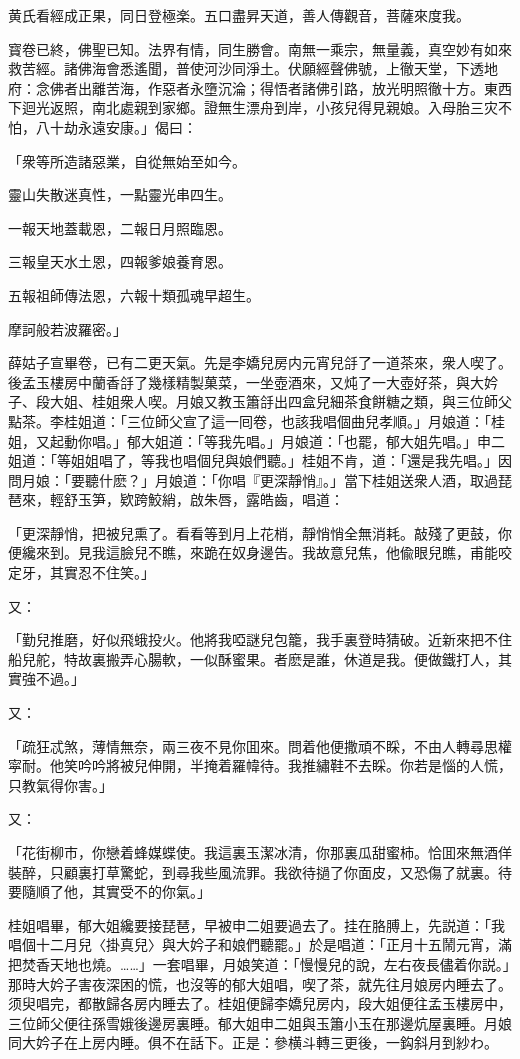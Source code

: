 黄氏看經成正果，同日登極楽。五口盡昇天道，善人傳觀音，菩薩來度我。

寳卷已終，佛聖已知。法界有情，同生勝會。南無一乘宗，無量義，真空妙有如來救苦經。諸佛海會悉遙聞，普使河沙同淨土。伏願經聲佛號，上徹天堂，下透地府：念佛者出離苦海，作惡者永墮沉淪；得悟者諸佛引路，放光明照徹十方。東西下迴光返照，南北處親到家鄉。證無生漂舟到岸，小孩兒得見親娘。入母胎三灾不怕，八十劫永遠安康。」偈曰：

「衆等所造諸惡業，自從無始至如今。

靈山失散迷真性，一點靈光串四生。

一報天地蓋載恩，二報日月照臨恩。

三報皇天水土恩，四報爹娘養育恩。

五報祖師傳法恩，六報十類孤魂早超生。

摩訶般若波羅密。」

薛姑子宣畢卷，已有二更天氣。先是李嬌兒房内元宵兒㧱了一道茶來，衆人喫了。後孟玉樓房中蘭香㧱了幾樣精製菓菜，一坐壺酒來，又炖了一大壺好茶，與大妗子、段大姐、桂姐衆人喫。月娘又教玉簫㧱出四盒兒細茶食餅糖之類，與三位師父點茶。李桂姐道：「三位師父宣了這一囘卷，也該我唱個曲兒孝順。」月娘道：「桂姐，又起動你唱。」郁大姐道：「等我先唱。」月娘道：「也罷，郁大姐先唱。」申二姐道：「等姐姐唱了，等我也唱個兒與娘們聽。」桂姐不肯，道：「還是我先唱。」因問月娘：「要聽什麽？」月娘道：「你唱『更深靜悄』。」當下桂姐送衆人酒，取過琵琶來，輕舒玉笋，欵跨鮫綃，啟朱唇，露皓齒，唱道：

「更深靜悄，把被兒熏了。看看等到月上花梢，靜悄悄全無消耗。敲殘了更鼓，你便纔來到。見我這臉兒不瞧，來跪在奴身邊告。我故意兒焦，他偸眼兒瞧，甫能咬定牙，其實忍不住笑。」

又：

「勤兒推磨，好似飛蛾投火。他將我啞謎兒包籠，我手裏登時猜破。近新來把不住船兒舵，特故裏搬弄心腸軟，一似酥蜜果。者麽是誰，休道是我。便做鐵打人，其實強不過。」

又：

「疏狂忒煞，薄情無奈，兩三夜不見你囬來。問着他便撒頑不睬，不由人轉尋思權寜耐。他笑吟吟將被兒伸開，半掩着羅幃待。我推繡鞋不去睬。你若是惱的人慌，只教氣得你害。」

又：

「花街柳市，你戀着蜂媒蝶使。我這裏玉潔冰清，你那裏瓜甜蜜柿。恰囬來無酒佯裝醉，只顧裏打草驚蛇，到尋我些風流罪。我欲待撾了你面皮，又恐傷了就裏。待要隨順了他，其實受不的你氣。」

桂姐唱畢，郁大姐纔要接琵琶，早被申二姐要過去了。挂在胳膊上，先説道：「我唱個十二月兒〈掛真兒〉與大妗子和娘們聽罷。」於是唱道：「正月十五鬧元宵，滿把焚香天地也燒。……」一套唱畢，月娘笑道：「慢慢兒的說，左右夜長儘着你説。」那時大妗子害夜深困的慌，也沒等的郁大姐唱，喫了茶，就先往月娘房内睡去了。须臾唱完，都散歸各房内睡去了。桂姐便歸李嬌兒房内，段大姐便往孟玉樓房中，三位師父便往孫雪娥後邊房裏睡。郁大姐申二姐與玉簫小玉在那邊炕屋裏睡。月娘同大妗子在上房内睡。俱不在話下。正是：參横斗轉三更後，一鈎斜月到紗わ。

